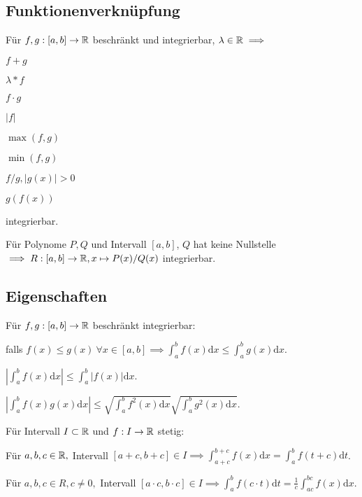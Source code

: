 \subsection{Funktionenverknüpfung}
\begin{compactitem}
    \item Für $f,g: [a, b] \to \mathbb{R}$ beschränkt und integrierbar, $\lambda \in \mathbb{R} \implies$
        \begin{inparaitem}
            \item $f+g$
            \item $\lambda * f$
            \item $f \cdot g$
            \item $|f|$
            \item $\max(f, g)$
            \item $\min(f, g)$
            \item $f / g, |g(x)| > 0$
            \item $g(f(x))$
        \end{inparaitem} integrierbar.
    \item Für Polynome $P, Q$ und Intervall $[a, b]$, $Q$ hat keine Nullstelle $\implies R: [a, b] \to \mathbb{R}, x \mapsto P(x) / Q(x)$ integrierbar.
\end{compactitem}

\subsection{Eigenschaften}
Für $f, g: [a,b] \to \mathbb{R}$ beschränkt integrierbar:
\begin{compactitem}
    \item falls $f(x) \le g(x) \ \forall x \in [a,b] \implies \int_{a}^{b} f(x) \mathrm{d}x \le \int_{a}^{b} g(x) \mathrm{d}x$.
    \item $\left| \int_{a}^{b} f(x) \mathrm{d}x \right| \le \int_{a}^{b} \left| f(x) \right| \mathrm{d}x$.
    \item $\left| \int_{a}^{b} f(x)g(x) \mathrm{d}x \right| \le \sqrt{\int_{a}^{b} f^2(x) \mathrm{d}x}\sqrt{\int_{a}^{b} g^2(x) \mathrm{d}x}$.
    \item Für Intervall $I \subset \mathbb{R}$ und $f: I \to \mathbb{R}$ stetig:
        \begin{compactitem}
            \item Für $a,b,c \in \mathbb{R},$ Intervall $[a+c, b+c] \in I \implies \int_{a+c}^{b+c} f(x) \mathrm{d}x = \int_{a}^{b} f(t + c)\mathrm{d}t$.
            \item Für $a,b,c \in R, c \neq 0,$ Intervall $[a \cdot c, b \cdot c] \in I \implies \int_{a}^{b} f(c \cdot t) \mathrm{d}t = \frac{1}{c} \int_{ac}^{bc} f(x) \mathrm{d}x$.
        \end{compactitem}
\end{compactitem}

